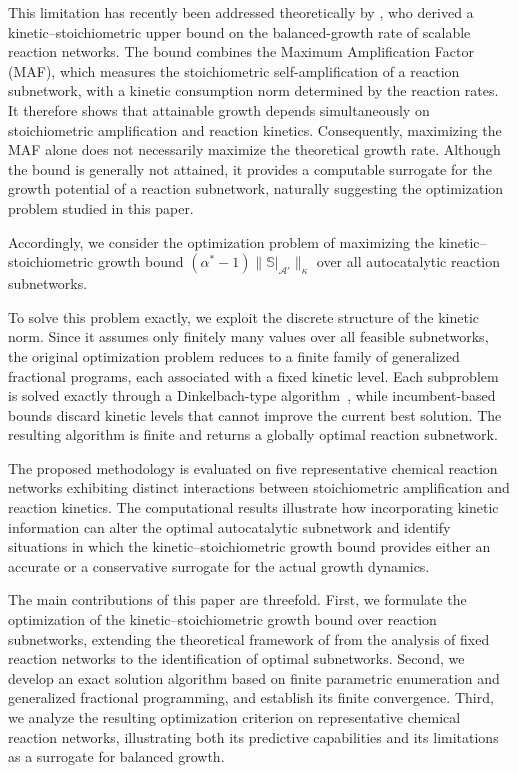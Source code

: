 \documentclass[a4paper,11pt,reqno]{amsart}
\begin{document}
This limitation has recently been addressed theoretically by
\citet{gagrani2026topological}, who derived a kinetic--stoichiometric
upper bound on the balanced-growth rate of scalable reaction networks.
The bound combines the Maximum Amplification Factor (MAF), which measures
the stoichiometric self-amplification of a reaction subnetwork, with a
kinetic consumption norm determined by the reaction rates. It therefore
shows that attainable growth depends simultaneously on stoichiometric
amplification and reaction kinetics. Consequently, maximizing the MAF
alone does not necessarily maximize the theoretical growth rate.
Although the bound is generally not attained, it provides a computable
surrogate for the growth potential of a reaction subnetwork, naturally
suggesting the optimization problem studied in this paper.

Accordingly, we consider the optimization problem of maximizing the kinetic--stoichiometric growth bound
$(\alpha^*-1)\|\mathbb S|_{\mathcal A'}\|_\kappa$
over all autocatalytic reaction subnetworks.

To solve this problem exactly, we exploit the discrete structure of the kinetic norm. Since it assumes only finitely many values over all feasible subnetworks, the original optimization problem reduces to a finite family of generalized fractional programs, each associated with a fixed kinetic level. Each subproblem is solved exactly through a Dinkelbach-type algorithm~\citep{dinkelbach1967,crouzeix1985}, while incumbent-based bounds discard kinetic levels that cannot improve the current best solution. The resulting algorithm is finite and returns a globally optimal reaction subnetwork.

The proposed methodology is evaluated on five representative chemical reaction networks exhibiting distinct interactions between stoichiometric amplification and reaction kinetics. The computational results illustrate how incorporating kinetic information can alter the optimal autocatalytic subnetwork and identify situations in which the kinetic--stoichiometric growth bound provides either an accurate or a conservative surrogate for the actual growth dynamics.

The main contributions of this paper are threefold. First, we formulate the optimization of the kinetic--stoichiometric growth bound over reaction subnetworks, extending the theoretical framework of \citet{gagrani2026topological} from the analysis of fixed reaction networks to the identification of optimal subnetworks. Second, we develop an exact solution algorithm based on finite parametric enumeration and generalized fractional programming, and establish its finite convergence. Third, we analyze the resulting optimization criterion on representative chemical reaction networks, illustrating both its predictive capabilities and its limitations as a surrogate for balanced growth.
\end{document}
